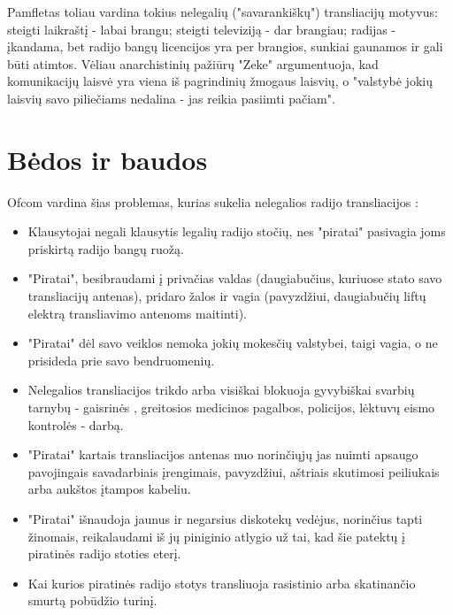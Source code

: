 \documentclass[kursinis-darbas]{vukf}
\begin{document}
Pamfletas toliau vardina tokius nelegalių ("savarankiškų") transliacijų motyvus: steigti laikraštį - labai brangu; steigti televiziją - dar brangiau; radijas - įkandama, bet radijo bangų licencijos yra per brangios, sunkiai gaunamos ir gali būti atimtos. Vėliau anarchistinių pažiūrų "Zeke" argumentuoja, kad komunikacijų laisvė yra viena iš pagrindinių žmogaus laisvių, o "valstybė jokių laisvių savo piliečiams nedalina - jas reikia pasiimti pačiam".


\section{Bėdos ir baudos}

\gls{Ofcom} vardina šias problemas, kurias sukelia nelegalios radijo transliacijos \cite{ofcom_pirate_radio_fines} \cite{bbc_radio_4_do_pirates_rule_the_air_waves}:

\begin{itemize}
	\item Klausytojai negali klausytis legalių radijo stočių, nes "piratai" pasivagia joms priskirtą radijo bangų ruožą.
	\item "Piratai", besibraudami į privačias valdas (daugiabučius, kuriuose stato savo transliacijų antenas), pridaro žalos ir vagia (pavyzdžiui, daugiabučių liftų elektrą transliavimo antenoms maitinti).
	\item "Piratai" dėl savo veiklos nemoka jokių mokesčių valstybei, taigi vagia, o ne prisideda prie savo bendruomenių.
	\item Nelegalios transliacijos trikdo arba visiškai blokuoja gyvybiškai svarbių tarnybų - gaisrinės \cite{ofcom_illegal_broadcasting_factsheet}, greitosios medicinos pagalbos, policijos, lėktuvų eismo kontrolės - darbą.
	\item "Piratai" kartais transliacijos antenas nuo norinčiųjų jas nuimti apsaugo pavojingais savadarbiais įrengimais, pavyzdžiui, aštriais skutimosi peiliukais arba aukštos įtampos kabeliu. \cite{ofcom_illegal_broadcasting_factsheet}
	\item "Piratai" išnaudoja jaunus ir negarsius diskotekų vedėjus, norinčius tapti žinomais, reikalaudami iš jų piniginio atlygio už tai, kad šie patektų į piratinės radijo stoties eterį. \cite{ofcom_illegal_broadcasting_factsheet}
	\item Kai kurios piratinės radijo stotys transliuoja rasistinio arba skatinančio smurtą pobūdžio turinį. \cite{ofcom_illegal_broadcasting_factsheet}
\end{itemize}
\end{document}
